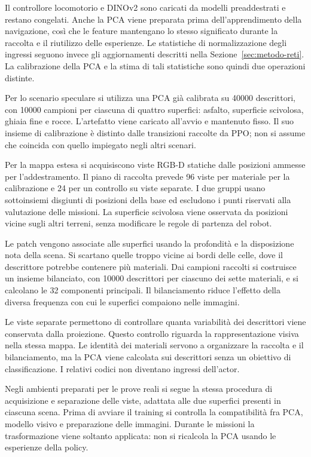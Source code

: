 Il controllore locomotorio e DINOv2 sono caricati da modelli preaddestrati e restano congelati. Anche la PCA viene preparata prima dell'apprendimento della navigazione, così che le feature mantengano lo stesso significato durante la raccolta e il riutilizzo delle esperienze. Le statistiche di normalizzazione degli ingressi seguono invece gli aggiornamenti descritti nella Sezione~\ref{sec:metodo-reti}. La calibrazione della PCA e la stima di tali statistiche sono quindi due operazioni distinte.

Per lo scenario speculare si utilizza una PCA già calibrata su 40000 descrittori, con 10000 campioni per ciascuna di quattro superfici: asfalto, superficie scivolosa, ghiaia fine e rocce. L'artefatto viene caricato all'avvio e mantenuto fisso. Il suo insieme di calibrazione è distinto dalle transizioni raccolte da PPO; non si assume che coincida con quello impiegato negli altri scenari.

Per la mappa estesa si acquisiscono viste RGB-D statiche dalle posizioni ammesse per l'addestramento. Il piano di raccolta prevede 96 viste per materiale per la calibrazione e 24 per un controllo su viste separate. I due gruppi usano sottoinsiemi disgiunti di posizioni della base ed escludono i punti riservati alla valutazione delle missioni. La superficie scivolosa viene osservata da posizioni vicine sugli altri terreni, senza modificare le regole di partenza del robot.

Le patch vengono associate alle superfici usando la profondità e la disposizione nota della scena. Si scartano quelle troppo vicine ai bordi delle celle, dove il descrittore potrebbe contenere più materiali. Dai campioni raccolti si costruisce un insieme bilanciato, con 10000 descrittori per ciascuno dei sette materiali, e si calcolano le 32 componenti principali. Il bilanciamento riduce l'effetto della diversa frequenza con cui le superfici compaiono nelle immagini.

Le viste separate permettono di controllare quanta variabilità dei descrittori viene conservata dalla proiezione. Questo controllo riguarda la rappresentazione visiva nella stessa mappa. Le identità dei materiali servono a organizzare la raccolta e il bilanciamento, ma la PCA viene calcolata sui descrittori senza un obiettivo di classificazione. I relativi codici non diventano ingressi dell'actor.

Negli ambienti preparati per le prove reali si segue la stessa procedura di acquisizione e separazione delle viste, adattata alle due superfici presenti in ciascuna scena. Prima di avviare il training si controlla la compatibilità fra PCA, modello visivo e preparazione delle immagini. Durante le missioni la trasformazione viene soltanto applicata: non si ricalcola la PCA usando le esperienze della policy.

